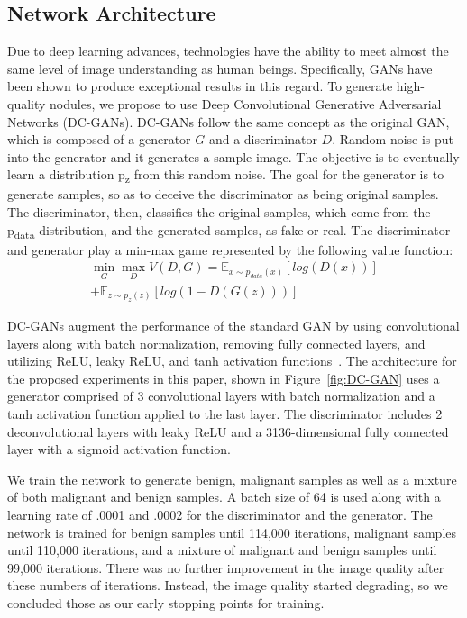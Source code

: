 \documentclass{article}
\begin{document}
\vspace{-5 px}
\subsection{Network Architecture}
Due to deep learning advances, technologies have the ability to meet almost the same level of image understanding as human beings. Specifically, GANs have been shown to produce exceptional results in this regard. To generate high-quality nodules, we propose to use Deep Convolutional Generative Adversarial Networks (DC-GANs). DC-GANs follow the same concept as the original GAN, which is composed of a generator $G$ and a discriminator $D$. Random noise is put into the generator and it generates a sample image. The objective is to eventually learn a distribution p\textsubscript{z} from this random noise. The goal for the generator is to generate samples, so as to deceive the discriminator as being original samples. The discriminator, then, classifies the original samples, which come from the p\textsubscript{data} distribution, and the generated samples, as fake or real. The discriminator and generator play a min-max game represented by the following value function:
\begin{equation}
\begin{split}
\min_{G} \max_{D} V(D,G) = \mathbb{E}_{x \sim p_{data}(x)} [log(D(x))] \\ +
\mathbb{E}_{z \sim p_{z}(z)} [log(1-D(G(z)))]
\end{split}
\end{equation}

DC-GANs augment the performance of the standard GAN by using convolutional layers along with batch normalization, removing fully connected layers, and utilizing ReLU, leaky ReLU, and tanh activation functions~\cite{radford2015unsupervised}. The architecture for the proposed experiments in this paper, shown in Figure~\ref{fig:DC-GAN} uses a generator comprised of 3 convolutional layers with batch normalization and a tanh activation function applied to the last layer. The discriminator includes 2 deconvolutional layers with leaky ReLU and a 3136-dimensional fully connected layer with a sigmoid activation function. 

We train the network to generate benign, malignant samples as well as a mixture of both malignant and benign samples. A batch size of 64 is used along with a learning rate of .0001 and .0002 for the discriminator and the generator. The network is trained for benign samples until 114,000 iterations, malignant samples until 110,000 iterations, and a mixture of malignant and benign samples until 99,000 iterations. There was no further improvement in the image quality after these numbers of iterations. Instead, the image quality started degrading, so we concluded those as our early stopping points for training.
\end{document}
